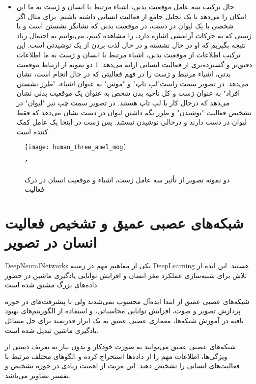 \begin{itemize}
	\item
	حال ترکیب سه عامل موقعیت بدنی، اشیاء مرتبط با انسان و ژست به ما این امکان را می‌دهد تا یک تحلیل جامع از فعالیت انسانی داشته باشیم. برای مثال اگر شخصی با یک لیوان در دست، در موقعیت بدنی که نشانگر نشستن است و با ژستی که به حرکات آرامشی اشاره دارد، را مشاهده کنیم، می‌توانیم به احتمال زیاد نتیجه بگیریم که او در حال نشسته و در حال لذت بردن از یک نوشیدنی است. این ترکیب اطلاعات از موقعیت بدنی، اشیاء مرتبط با انسان و ژست به ما اطلاعات دقیق‌تر و گسترده‌تری از فعالیت انسانی ارائه می‌دهد. 
\ref{fig:human_three_amel_mog}
دو نمونه از ارتباط موقعیت بدنی، اشیاء مرتبط و ژست را در فهم فعالیتی که در حال انجام است، نشان می‌دهد. در تصویر سمت  راست"لپ تاپ" و "موس" به عنوان اشیاء، "طرز نشستن افراد" به عنوان ژست و کل ناحیه بدن شخص به عنوان یک موقعیت بدنی نشان می‌دهد که درحال کار با لپ تاپ هستند. در تصویر سمت چپ نیز "لیوان" در تشخیص فعالیت "نوشیدن" و طرز نگه داشتن لیوان در دست نشان می‌دهد که فقط لیوان در دست دارند و درحالی نوشیدن نیستند. پس ژست در اینجا یک عامل کمک کننده است.
\end{itemize}
\vspace{8pt}
\begin{figure}[ht]
	\centerline{\texttt{[image: human\_three\_amel\_mog]}}
	\caption{دو نمونه تصویر از تأثیر سه عامل ژست، اشیاء و موقعیت انسان در درک فعالیت
		\cite{tasvirSevomChapterYek}
	}ُ
	\label{fig:human_three_amel_mog}
\end{figure}
\vspace{20pt}

\section{شبکه‌های عصبی عمیق و تشخیص فعالیت انسان در تصویر}

\gls{DeepNeuralNetworks}
 یکی از مفاهیم مهم در زمینه %
\gls{DeepLearning}
  هستند. این ایده از تلاش برای شبیه‌سازی عملکرد مغز انسان و افزایش توانایی یادگیری ماشین در حضور داده‌های بزرگ مشتق شده است.

شبکه‌های عصبی عمیق از ابتدا ایده‌آل محسوب نمی‌شدند ولی با پیشرفت‌های در حوزه پردازش تصویر و صوت، افزایش توانایی محاسباتی، و استفاده از الگوریتم‌های بهبود یافته در آموزش شبکه‌ها، معماری عصبی عمیق به یک ابزار قدرتمند برای حل مسائل یادگیری ماشین تبدیل شده است.

شبکه‌های عصبی عمیق می‌توانند به صورت خودکار و بدون نیاز به تعریف دستی از ویژگی‌ها، اطلاعات مهم را از داده‌ها استخراج کرده و الگوهای مختلف مرتبط با فعالیت‌های انسانی را تشخیص دهند. این مزیت از اهمیت زیادی در حوزه تشخیص و تفسیر تصاویر می‌باشد.

